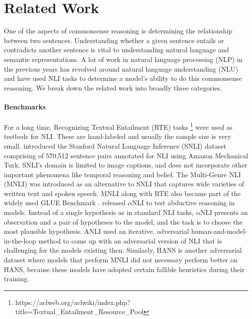 \section{Related Work}

One of the aspects of commonsense reasoning is determining the relationship between two sentences. Understanding whether a given sentence entails or contradicts another sentence is vital to understanding natural language and semantic representations. A lot of work in natural language processing (NLP) in the previous years has revolved around natural language understanding (NLU) and have used NLI tasks to determine a model's ability to do this commonsense reasoning. We break down the related work into broadly three categories.

\paragraph{Benchmarks} For a long time, Recognizing Textual Entailment (RTE) tasks \footnote{https://aclweb.org/aclwiki/index.php?\\title=Textual\_Entailment\_Resource\_Pool}  were used as testbeds for NLI. These are hand-labeled and usually the sample size is very small.
\citet{bowman-etal-2015-large} introduced the Stanford Natural Language Inference (SNLI) dataset comprising of 570,512 sentence pairs annotated for NLI using Amazon Mechanical Turk. SNLI's domain is limited to image captions, and does not incorporate other important phenomena like temporal reasoning and belief.
The Multi-Genre NLI (MNLI) \citep{williams-etal-2018-broad} was introduced as an alternative to SNLI that captures wide varieties of written text and spoken speech.
MNLI along with RTE also became part of the widely used GLUE Benchmark \citep{wang2019glue}.
\citet{bhagavatula2020abductive} released $\alpha$NLI to test abductive reasoning in models. Instead of a single hypothesis as in standard NLI tasks, $\alpha$NLI presents an observation and a pair of hypotheses to the model, and the task is to choose the most plausible hypothesis.
ANLI \citep{nie-etal-2020-adversarial} used an iterative, adversarial human-and-model-in-the-loop method to come up with an adversarial version of NLI that is challenging for the models existing then.
Similarly, HANS \citep{mccoy-etal-2019-right} is another adversarial dataset where models that perform MNLI did not necessary perform better on HANS, because these models have adopted certain fallible heuristics during their training.

